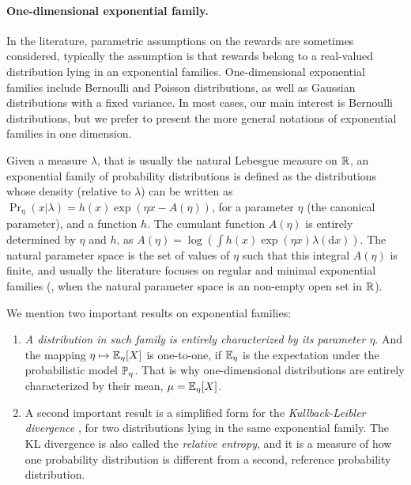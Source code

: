 
\paragraph{One-dimensional exponential family.}
%

In the literature, parametric assumptions on the rewards are sometimes considered, typically the assumption is that rewards belong to a real-valued distribution lying in an exponential families.
One-dimensional exponential families include Bernoulli and Poisson distributions, as well as Gaussian distributions with a fixed variance.
In most cases, our main interest is Bernoulli distributions, but we prefer to present the more general notations of exponential families in one dimension.

Given a measure $\lambda$, that is usually the natural Lebesgue measure on $\mathbb{R}$, an exponential family of probability distributions is defined as the distributions whose density (relative to $\lambda$) can be written as
$ \Pr_{\eta}(x | \lambda) = h(x) \exp \left( \eta x - A(\eta) \right)$,
for a parameter $\eta$ (the canonical parameter),
and a function $h$.
The cumulant function $A(\eta)$ is entirely determined by $\eta$ and $h$,
as $A(\eta) = \log \left( \int h(x) \exp(\eta x) \lambda(\mathrm{d} x) \right)$.
%
The natural parameter space is the set of values of $\eta$ such that this integral $A(\eta)$ is finite,
and usually the literature focuses on regular and minimal exponential families (\ie, when the natural parameter space is an non-empty open set in $\mathbb{R}$).

We mention two important results on exponential families:

\begin{enumerate}
    \item
    \emph{A distribution in such family is entirely characterized by its parameter $\eta$}.
    And the mapping $\eta \mapsto \mathbb{E}_{\eta}[X]$ is one-to-one,
    if $\mathbb{E}_{\eta}$ is the expectation under the probabilistic model $\mathbb{P}_{\eta}$.
    That is why one-dimensional distributions are entirely characterized by their mean, $\mu = \mathbb{E}_{\eta}[X]$.

    \item
    A second important result is a simplified form for the \emph{Kullback-Leibler divergence} \cite{KullbackLeibler51}, for two distributions lying in the same exponential family.
    The KL divergence is also called the \emph{relative entropy},
    and it is a measure of how one probability distribution is different from a second, reference probability distribution.
\end{enumerate}

